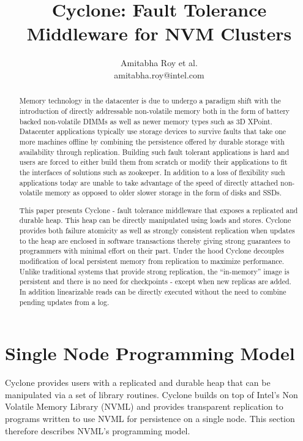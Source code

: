 \documentclass[twocolumn]{article}
\begin{document}
\title{Cyclone: Fault Tolerance Middleware for NVM Clusters}
\author{Amitabha Roy et al. \\ amitabha.roy@intel.com}
\maketitle
\begin{abstract}
Memory technology in the datacenter is due to undergo a paradigm shift with the
introduction of directly addressable non-volatile memory both in the form of
battery backed non-volatile DIMMs as well as newer memory types such as
3D XPoint. Datacenter applications typically use storage devices to survive
faults that take one more machines offline by combining the persistence offered by
durable storage with availability through replication. Building such fault
tolerant applications is hard and users are forced to either build
them from scratch or modify their applications to fit the interfaces of solutions
such as zookeeper. In addition to a loss of flexibility such applications today
are unable to take advantage of the speed of directly attached non-volatile
memory as opposed to older slower storage in the form of disks and SSDs.

This paper presents Cyclone - fault tolerance middleware that exposes a
replicated and durable heap. This heap can be directly manipulated using loads and
stores. Cyclone provides both failure atomicity as well as
strongly consistent replication when updates to the heap are enclosed in
software transactions thereby giving strong guarantees to programmers
with minimal effort on their part. Under the hood Cyclone decouples modification
of local persistent memory from replication to maximize performance. Unlike
traditional systems that provide strong replication, the ``in-memory'' image is
persistent and there is no need for checkpoints - except when new replicas are
added. In addition linearizable reads can be directly executed without the need to
combine pending updates from a log.
\end{abstract}  


\section{Single Node Programming Model}
Cyclone provides users with a replicated and durable heap that can be
manipulated via a set of library routines. Cyclone builds on top of Intel's Non
Volatile Memory Library (NVML) and provides transparent replication to programs
written to use NVML for persistence on a single node. This section therefore
describes NVML's programming model.
\end{document}
